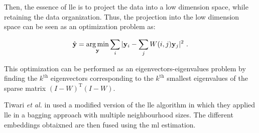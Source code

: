 Then, the essence of \ac{lle} is to project the data into a low dimension space, while retaining the data organization.
Thus, the projection into the low dimension space can be seen as an optimization problem as:

\begin{equation}
	\hat{\mathbf{y}} = \operatorname*{arg\,min}_{\mathbf{y}} \sum_i | \mathbf{y}_i - \sum_j W(i,j)\mathbf{y}_j |^{2} \ .
	\label{eq:lowprojlle}
\end{equation}

\noindent This optimization can be performed as an eigenvectors-eigenvalues problem by finding the $k^{\text{th}}$ eigenvectors corresponding to the $k^{\text{th}}$ smallest eigenvalues of the sparse matrix $(I-W)^{\text{T}}(I-W)$.


Tiwari \textit{et al.} in \cite{Tiwari2008} used a modified version of the \ac{lle} algorithm in which they applied \ac{lle} in a bagging approach with multiple neighbourhood sizes.
The different embeddings obtaixned are then fused using the \ac{ml} estimation.
